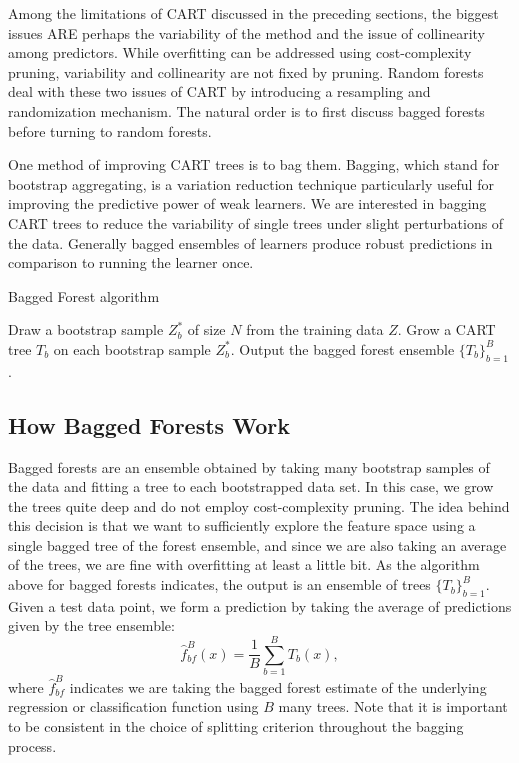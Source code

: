 \documentclass[12pt,twoside]{reedthesis}
\theoremstyle{definition}
\theoremstyle{definition}
\theoremstyle{definition}
\theoremstyle{remark}
\begin{document}
Among the limitations of CART discussed in the preceding sections, the
biggest issues ARE perhaps the variability of the method and the issue
of collinearity among predictors. While overfitting can be addressed
using cost-complexity pruning, variability and collinearity are not
fixed by pruning. Random forests deal with these two issues of CART by
introducing a resampling and randomization mechanism. The natural order
is to first discuss bagged forests before turning to random forests.
\par

One method of improving CART trees is to bag them. Bagging, which stand
for bootstrap aggregating, is a variation reduction technique
particularly useful for improving the predictive power of weak learners.
We are interested in bagging CART trees to reduce the variability of
single trees under slight perturbations of the data. Generally bagged
ensembles of learners produce robust predictions in comparison to
running the learner once. \par
\begin{algorithm}
        \caption{Bagged Forest algorithm}\label{bagged forest}
        \begin{algorithmic}[1]
            \State Draw a bootstrap sample $Z_b^*$ of size $N$ from the training data $Z$.
            \State Grow a CART tree $T_b$ on each bootstrap sample $Z_b^*$.
            \EndFor
            \State Output the bagged forest ensemble $\{T_b\}_{b=1}^B$.
        \end{algorithmic}
    \end{algorithm}
\subsection{How Bagged Forests Work}\label{how-bagged-forests-work}

Bagged forests are an ensemble obtained by taking many bootstrap samples
of the data and fitting a tree to each bootstrapped data set. In this
case, we grow the trees quite deep and do not employ cost-complexity
pruning. The idea behind this decision is that we want to sufficiently
explore the feature space using a single bagged tree of the forest
ensemble, and since we are also taking an average of the trees, we are
fine with overfitting at least a little bit. As the algorithm above for
bagged forests indicates, the output is an ensemble of trees
\(\{T_b\}_{b=1}^B\). Given a test data point, we form a prediction by
taking the average of predictions given by the tree ensemble:
\[\hat{f}_{bf}^B(x)=\frac{1}{B}\sum_{b=1}^B T_b(x),\] where
\(\hat{f}_{bf}^B\) indicates we are taking the bagged forest estimate of
the underlying regression or classification function using \(B\) many
trees. Note that it is important to be consistent in the choice of
splitting criterion throughout the bagging process. \par
\end{document}
